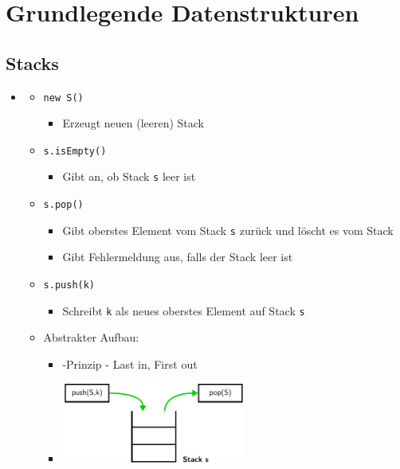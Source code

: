 \documentclass[
    12pt,
    a4paper,
    ngerman,
    color=3b,%
    marginpar=false,
    colorback=false,
    leqno,
]{tudaexercise}
\begin{document}
\section{Grundlegende Datenstrukturen}
\subsection{Stacks}\label{Stacks}
\begin{itemize}
    \item {}
          \begin{itemize}
              \item \texttt{new S()}
                    \begin{itemize}
                        \item Erzeugt neuen (leeren) Stack
                    \end{itemize}
              \item \texttt{s.isEmpty()}
                    \begin{itemize}
                        \item Gibt an, ob Stack \texttt{s} leer ist
                    \end{itemize}
              \item \texttt{s.pop()}
                    \begin{itemize}
                        \item Gibt oberstes Element vom Stack \texttt{s} zurück und löscht es vom Stack
                        \item Gibt Fehlermeldung aus, falls der Stack leer ist
                    \end{itemize}
              \item \texttt{s.push(k)}
                    \begin{itemize}
                        \item Schreibt \texttt{k} als neues oberstes Element auf Stack \texttt{s}
                    \end{itemize}
              \item Abstrakter Aufbau:
                    \begin{itemize}
                        \item {}-Prinzip - Last in, First out
                        \item[] \includegraphics[width=6cm]{pictures/LIFO/lifo}
                    \end{itemize}
          \end{itemize}


\end{itemize}
\end{document}
